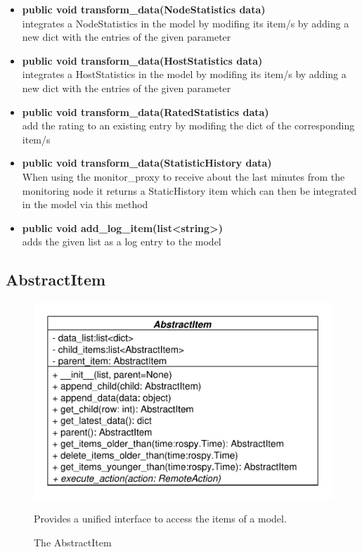 \begin{itemize}
  \item \textbf{public void transform\_data(NodeStatistics data)}\\ 
  integrates a NodeStatistics in the model by modifing its item/s by adding a new dict with the entries of the given parameter
  \item \textbf{public void transform\_data(HostStatistics data)}\\ 
  integrates a HostStatistics in the model by modifing its item/s by adding a new dict with the entries of the given parameter
  \item \textbf{public void transform\_data(RatedStatistics data)}\\ 
  add the rating to an existing entry by modifing the dict of the corresponding
  item/s
  \item \textbf{public void transform\_data(StatisticHistory data)}\\ 
  When using the monitor\_proxy to receive about the last minutes from the monitoring node
  it returns a StaticHistory item which can then be integrated in the model via this method
  \item\textbf{public void add\_log\_item(list<string>)}\\
  adds the given list as a log entry to the model
  \end{itemize}

\subsection{AbstractItem}
\begin{figure}[htbp]
	\begin{minipage}[t]{7cm}
		\vspace{0pt}
		\centering
		\includegraphics[scale=0.6]{./diagram_pictures/AbstractItem.pdf}
		\caption{The AbstractItem}
	\end{minipage}
	\hfill
	\begin{minipage}[t]{6cm}
		\vspace{10pt}		
		Provides a unified interface to access the items of a model.
	\end{minipage}
\end{figure}

